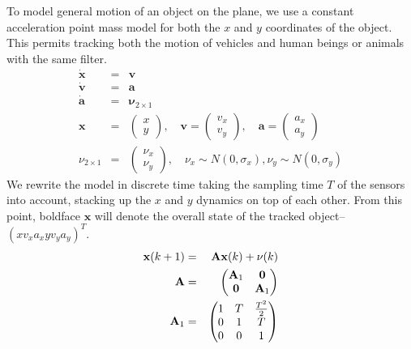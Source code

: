 To model general motion of an object on the plane, we use a constant acceleration point mass model for both the $x$ and $y$ coordinates of the object. This permits tracking both the motion of vehicles and human beings or animals with the same filter.
\begin{eqnarray}
  \dot{\mathbf{x}} &=&\mathbf{v} \nonumber \\
  \dot{\mathbf{v}} &=& {\mathbf{a}}\nonumber \\
  \dot{\mathbf{a}} &=& \mathbf{\nu }_{2 \times 1}\nonumber\\
  \mathbf{x}&=&\left(\begin{array}{c} x \\y\end{array}\right),\quad   \mathbf{v}=\left(\begin{array}{c} v_x \\v_y\end{array}\right),\quad  \mathbf{a}=\left(\begin{array}{c} a_x \\a_y\end{array}\right)\nonumber\\
  {\nu }_{2 \times 1}&=&\left(\begin{array}{c} \nu_x \\\nu_y\end{array}\right),\quad
  \nu_x\sim N(0,\sigma_x), \nu_y\sim N(0,\sigma_y)\label{eqn:pointmassmodelcontinuous}
\end{eqnarray}
We rewrite the model in discrete time taking the sampling time $T$ of the sensors into account, stacking up the $x$ and $y$ dynamics on top of each other. From this point, boldface $\mathbf{x}$ will denote the overall state of the tracked object--$\left( x v_x a_x y v_y a_y\right)^T$.
\begin{eqnarray}
\mathbf{x}(k+1)&=&\mathbf{A}\mathbf{x}(k)+\mathbf{\nu}(k)\label{eqn:pointmassmodeldiscrete}\\
\mathbf{A}&=&\begin{pmatrix}
             \mathbf{A}_1 & \mathbf{0} \\
             \mathbf{0} & \mathbf{A}_1 \\
           \end{pmatrix}\nonumber\\
\mathbf{A}_1&=&\begin{pmatrix}
                 1 & T & {T^2\over 2} \\
                 0 & 1 & T \\
                 0 & 0 & 1 \\
               \end{pmatrix}\nonumber\\
\end{eqnarray}


